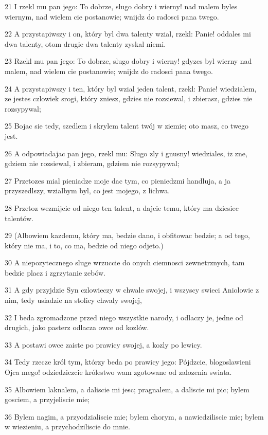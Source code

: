\par 21 I rzekl mu pan jego: To dobrze, slugo dobry i wierny! nad malem byles wiernym, nad wielem cie postanowie; wnijdz do radosci pana twego.
\par 22 A przystapiwszy i on, który byl dwa talenty wzial, rzekl: Panie! oddales mi dwa talenty, otom drugie dwa talenty zyskal niemi.
\par 23 Rzekl mu pan jego: To dobrze, slugo dobry i wierny! gdyzes byl wierny nad malem, nad wielem cie postanowie; wnijdz do radosci pana twego.
\par 24 A przystapiwszy i ten, który byl wzial jeden talent, rzekl: Panie! wiedzialem, ze jestes czlowiek srogi, który zniesz, gdzies nie rozsiewal, i zbierasz, gdzies nie rozsypywal;
\par 25 Bojac sie tedy, szedlem i skrylem talent twój w ziemie; oto masz, co twego jest.
\par 26 A odpowiadajac pan jego, rzekl mu: Slugo zly i gnusny! wiedziales, iz zne, gdziem nie rozsiewal, i zbieram, gdziem nie rozsypywal;
\par 27 Przetozes mial pieniadze moje dac tym, co pieniedzmi handluja, a ja przyszedlszy, wzialbym byl, co jest mojego, z lichwa.
\par 28 Przetoz wezmijcie od niego ten talent, a dajcie temu, który ma dziesiec talentów.
\par 29 (Albowiem kazdemu, który ma, bedzie dano, i obfitowac bedzie; a od tego, który nie ma, i to, co ma, bedzie od niego odjeto.)
\par 30 A niepozytecznego sluge wrzuccie do onych ciemnosci zewnetrznych, tam bedzie placz i zgrzytanie zebów.
\par 31 A gdy przyjdzie Syn czlowieczy w chwale swojej, i wszyscy swieci Aniolowie z nim, tedy usiadzie na stolicy chwaly swojej,
\par 32 I beda zgromadzone przed niego wszystkie narody, i odlaczy je, jedne od drugich, jako pasterz odlacza owce od kozlów.
\par 33 A postawi owce zaiste po prawicy swojej, a kozly po lewicy.
\par 34 Tedy rzecze król tym, którzy beda po prawicy jego: Pójdzcie, blogoslawieni Ojca mego! odziedziczcie królestwo wam zgotowane od zalozenia swiata.
\par 35 Albowiem laknalem, a daliscie mi jesc; pragnalem, a daliscie mi pic; bylem gosciem, a przyjeliscie mie;
\par 36 Bylem nagim, a przyodzialiscie mie; bylem chorym, a nawiedziliscie mie; bylem w wiezieniu, a przychodziliscie do mnie.
